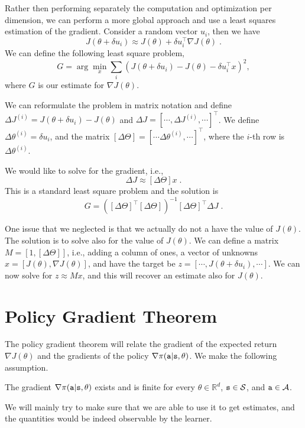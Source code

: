 Rather then performing separately the computation and optimization per dimension, we can perform a more global approach and use a least squares estimation of the gradient.
Consider a random vector $u_i$, then we have
\[
J(\theta+\delta u_i)\approx J(\theta)+\delta u_i^\top \nabla
J(\theta) \;.
\]
We can define the following least square problem,
\[
G= \arg\min_x \sum_i (J(\theta+\delta u_i)- J(\theta)-\delta
u_i^\top x)^2,
\]
where $G$ is our estimate for $\nabla J(\theta)$.

We can reformulate the problem in matrix notation and define $\Delta
J^{(i)}=J(\theta+\delta u_i)- J(\theta)$ and $\Delta J= [\cdots ,
\Delta J^{(i)}, \cdots]^\top$. We define $\Delta \theta^{(i)}=\delta
u_i$, and the matrix $[\Delta\Theta]=[\cdots
\Delta\theta^{(i)},\cdots]^\top$, where the $i$-th row is
$\Delta\theta^{(i)}$.

We would like to solve for the gradient, i.e.,
\[
\Delta J\approx [\Delta \Theta]x\;.
\]
This is a standard least square problem and the solution is
\[
G=([\Delta \Theta]^\top [\Delta \Theta])^{-1} [\Delta\Theta]^\top
\Delta J\;.
\]

One issue that we neglected is that we actually do not a have the
value of $J(\theta)$. The solution is to solve also for the value of
$J(\theta)$.
%
We can define a matrix $M=[1, [\Delta\Theta]]$, i.e., adding a column of ones, a vector of unknowns $x=[J(\theta), \nabla J(\theta)]$, and have the target be $z=[\cdots, J(\theta+\delta u_i),\cdots]$. We can now solve for $z\approx Mx$, and this will recover an estimate also for $J(\theta)$.


\section{Policy Gradient Theorem}

The policy gradient theorem will relate the gradient of the expected
return $\nabla J(\theta)$ and the gradients of the policy $\nabla
\pi({\tt a}|{\tt s},\theta)$. We make the following assumption.
\begin{assumption}\label{ass:differentiable_policy}
The gradient $\nabla
\pi({\tt a}|{\tt s},\theta)$ exists and is finite for every $\theta \in \mathbb{R}^d$, ${\tt s} \in \mathcal{S}$, and ${\tt a} \in \mathcal{A}$.
\end{assumption}

We will mainly try to make sure
that we are able to use it to get estimates, and the quantities
would be indeed observable by the learner.

